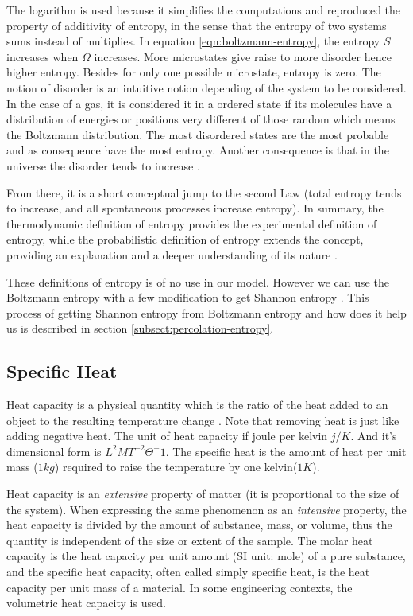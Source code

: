 		
		The logarithm is used because it simplifies the computations and reproduced the property of additivity of entropy, in the sense that the entropy of two systems sums instead of multiplies. In	equation \ref{eqn:boltzmann-entropy}, the entropy $S$ increases when $\Omega$ increases. More microstates give raise to more disorder	hence higher entropy. Besides for only one possible microstate, entropy is zero. The notion of	disorder is an intuitive notion depending of the system to be considered. In the case of a gas, it	is considered it in a ordered state if its molecules have a distribution of energies or positions very	
		different of those random which means the Boltzmann distribution. The most disordered states are	the most probable and as consequence have the most entropy. Another consequence is that in the	universe the disorder tends to increase \cite{Balibrea2016}.
		
		
		From there, it is a short conceptual jump to the second Law (total entropy tends to increase, and	all spontaneous processes increase entropy). In summary, the thermodynamic definition of entropy provides the experimental definition of entropy, while the probabilistic definition of entropy	extends the concept, providing an explanation and a deeper understanding of its nature \cite{Alam2016}.
		
		These definitions of entropy is of no use in our model. However we can use the Boltzmann entropy with a few modification to get Shannon entropy \cite{Shannon1948}. This process of getting Shannon entropy from Boltzmann entropy and how does it help us is described in section \ref{subsect:percolation-entropy}.

	
	\subsection{Specific Heat}
	Heat capacity is a physical quantity which is the ratio of the heat added to an object to the resulting temperature change \cite{Walker2013}. Note that removing heat is just like adding negative heat. The unit of heat capacity if joule per kelvin $j/K$. And it's dimensional form is $L^2MT^{-2}\Theta^-1$.	The specific heat is the amount of heat per unit mass ($1kg$) required to raise the temperature by one kelvin($1K$). 
	
	
	Heat capacity is an \textit{extensive} property of matter (it is proportional to the size of the system). When expressing the same phenomenon as an \textit{intensive} property, the heat capacity is divided by the amount of substance, mass, or volume, thus the quantity is independent of the size or extent of the sample. The molar heat capacity is the heat capacity per unit amount (SI unit: mole) of a pure substance, and the specific heat capacity, often called simply specific heat, is the heat capacity per unit mass of a material. In some engineering contexts, the volumetric heat capacity is used.
	

